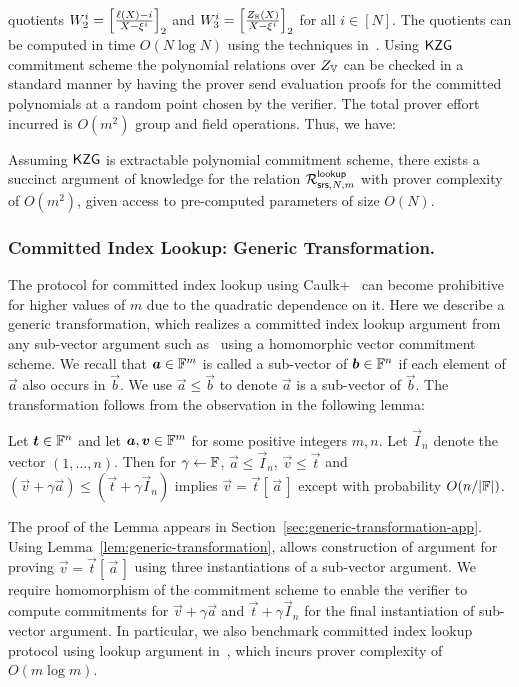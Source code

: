 quotients $W_2^i=\left[{\frac{\ell(X) - i}{X-\xi^i}}\right]_2$ and $W_3^i=\left[{\frac{Z_\mathbb{H}(X)}{X-\xi^i}}\right]_2$ for all $i\in [N]$.
The quotients can be computed in time $O(N\log N)$ using the techniques in~\cite{EPRINT:FeiKho23}. Using $\mathsf{KZG}$ commitment
scheme the polynomial relations over $Z_{\mathbb{V}}$ can be checked in a standard manner
by having the prover send evaluation proofs for the committed polynomials at a random point chosen by the verifier.
The total prover effort incurred is $O(m^2)$ group and field operations.
Thus, we have:
\begin{lemma}\label{lem:comm-index-lookup}
Assuming $\mathsf{KZG}$ is extractable polynomial commitment scheme, there exists a succinct argument of knowledge for
the relation $\mathcal{R}^{\mathsf{lookup}}_{\mathsf{srs},N,m}$ with prover complexity of $O(m^2)$, given access to pre-computed parameters of size $O(N)$.
\end{lemma}

\subsubsection{Committed Index Lookup: Generic Transformation.}\label{subsubsec:generic-transformation}
The protocol for committed index lookup using Caulk+~\cite{EPRINT:PosKat22} can become prohibitive for higher values of
$m$ due to the quadratic dependence on it. Here we describe a generic transformation, which realizes a committed index lookup
argument from any sub-vector argument such as~\cite{CCS:ZBKMNS22,EPRINT:PosKat22,EPRINT:ZGKMR22,EPRINT:EagFioGab22} using a homomorphic
vector commitment scheme. We recall that $\vec{a}\in \F^m$ is called a sub-vector of $\vec{b}\in \F^n$ if each element of $\vec{a}$
also occurs in $\vec{b}$. We use $\vec{a}\leq \vec{b}$ to denote $\vec{a}$ is a sub-vector of $\vec{b}$.
The transformation follows from the observation in the following lemma:
\begin{lemma}\label{lem:generic-transformation}
Let $\vec{t}\in \F^n$ and let $\vec{a},\vec{v}\in \F^m$ for some positive integers $m,n$. Let $\vec{I}_n$ denote the vector $(1,\ldots,n)$.
Then for $\gamma\gets \mathbb{F}$, $\vec{a}\leq \vec{I}_n$, $\vec{v}\leq \vec{t}$ and $(\vec{v}+\gamma \vec{a})\leq (\vec{t} + \gamma \vec{I}_n)$ implies
$\vec{v}=\vec{t}[\,\vec{a}\,]$ except with probability $O(n/|\mathbb{F}|)$.
\end{lemma}
The proof of the Lemma appears in Section~\ref{sec:generic-transformation-app}.
Using Lemma~\ref{lem:generic-transformation}, allows construction of argument for proving $\vec{v}=\vec{t}[\,\vec{a}\,]$ using three instantiations
of a sub-vector argument. We require homomorphism of the commitment scheme to enable the verifier to compute commitments for $\vec{v}+\gamma \vec{a}$ and
$\vec{t} + \gamma \vec{I}_n$ for the final instantiation of sub-vector argument. In particular, we also benchmark committed index lookup
protocol using lookup argument in~\cite{EPRINT:EagFioGab22}, which incurs prover complexity of $O(m\log m)$.
~

